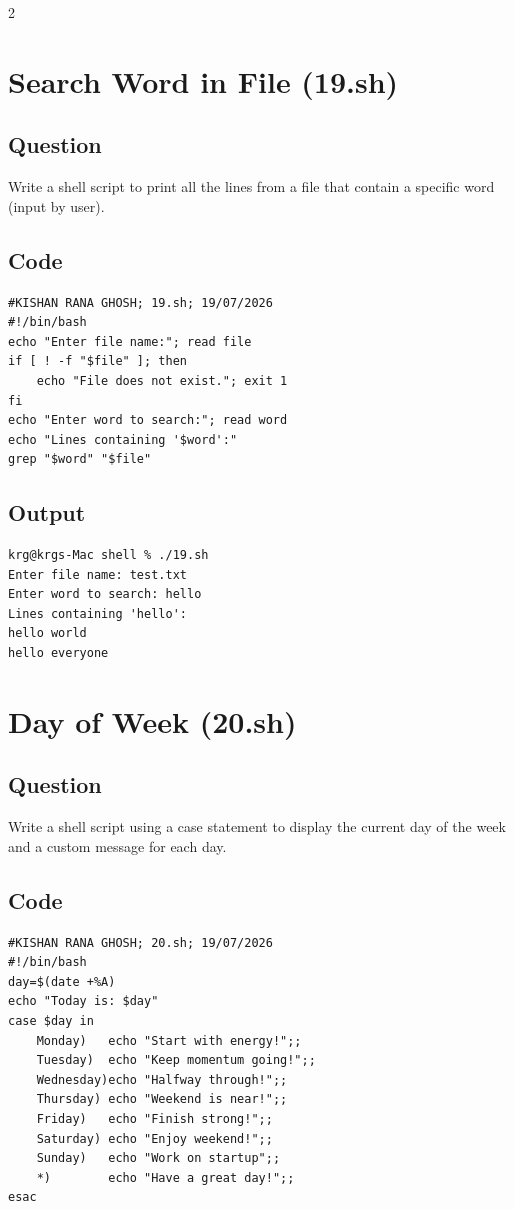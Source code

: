 \documentclass[a4paper,12pt]{article}
\begin{document}
\begin{multicols}{2}

\section{Search Word in File (19.sh)}
\subsection*{Question}
Write a shell script to print all the lines from a file that contain a specific word (input by user).

\subsection*{Code}
\begin{lstlisting}[style=bashstyle]
#KISHAN RANA GHOSH; 19.sh; 19/07/2026
#!/bin/bash
echo "Enter file name:"; read file
if [ ! -f "$file" ]; then
    echo "File does not exist."; exit 1
fi
echo "Enter word to search:"; read word
echo "Lines containing '$word':"
grep "$word" "$file"
\end{lstlisting}

\subsection*{Output}
\begin{lstlisting}[style=outputstyle]
krg@krgs-Mac shell % ./19.sh
Enter file name: test.txt
Enter word to search: hello
Lines containing 'hello':
hello world
hello everyone
\end{lstlisting}

\columnbreak

\section{Day of Week (20.sh)}
\subsection*{Question}
Write a shell script using a case statement to display the current day of the week and a custom message for each day.

\subsection*{Code}
\begin{lstlisting}[style=bashstyle]
#KISHAN RANA GHOSH; 20.sh; 19/07/2026
#!/bin/bash
day=$(date +%A)
echo "Today is: $day"
case $day in
    Monday)   echo "Start with energy!";;
    Tuesday)  echo "Keep momentum going!";;
    Wednesday)echo "Halfway through!";;
    Thursday) echo "Weekend is near!";;
    Friday)   echo "Finish strong!";;
    Saturday) echo "Enjoy weekend!";;
    Sunday)   echo "Work on startup";;
    *)        echo "Have a great day!";;
esac
\end{lstlisting}


\end{multicols}
\end{document}
